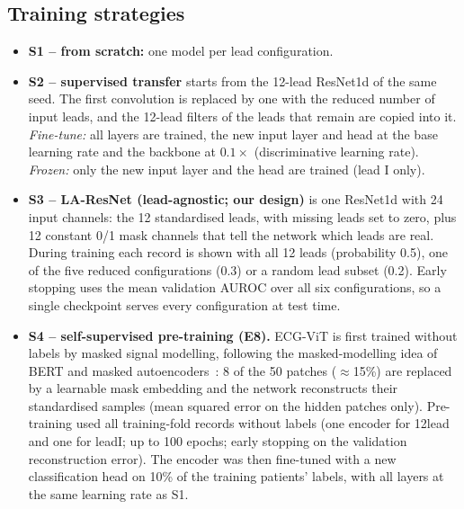 \subsection{Training strategies}
\begin{itemize}
  \item \textbf{S1 -- from scratch:} one model per lead configuration.
  \item \textbf{S2 -- supervised transfer} starts from the 12-lead ResNet1d of the same seed. The first convolution is replaced by one with the reduced number of input leads, and the 12-lead filters of the leads that remain are copied into it. \emph{Fine-tune:} all layers are trained, the new input layer and head at the base learning rate and the backbone at $0.1\times$ (discriminative learning rate). \emph{Frozen:} only the new input layer and the head are trained (lead I only).
  \item \textbf{S3 -- LA-ResNet (lead-agnostic; our design)} is one ResNet1d with 24 input channels: the 12 standardised leads, with missing leads set to zero, plus 12 constant 0/1 mask channels that tell the network which leads are real. During training each record is shown with all 12 leads (probability 0.5), one of the five reduced configurations (0.3) or a random lead subset (0.2). Early stopping uses the mean validation AUROC over all six configurations, so a single checkpoint serves every configuration at test time.
  \item \textbf{S4 -- self-supervised pre-training (E8).} ECG-ViT is first trained without labels by masked signal modelling, following the masked-modelling idea of BERT and masked autoencoders~\cite{devlin2019bert,he2022mae}: 8 of the 50 patches ($\approx$15\%) are replaced by a learnable mask embedding and the network reconstructs their standardised samples (mean squared error on the hidden patches only). Pre-training used all training-fold records without labels (one encoder for 12lead and one for leadI; up to 100 epochs; early stopping on the validation reconstruction error). The encoder was then fine-tuned with a new classification head on 10\% of the training patients' labels, with all layers at the same learning rate as S1.
\end{itemize}

